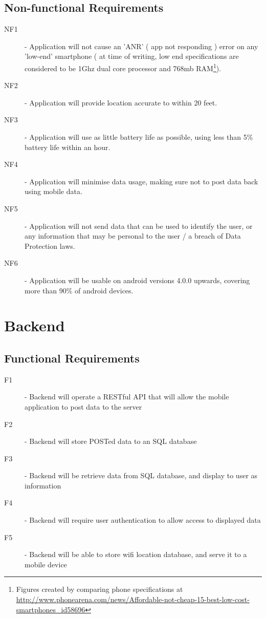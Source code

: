 \documentclass[11pt]{informatics-report}
\begin{document}
\subsection{Non-functional Requirements}
\begin{description}
\item[NF1] - Application will not cause an 'ANR' ( app not responding ) error on any 'low-end' smartphone ( at time of writing, low end specifications are considered to be 1Ghz dual core processor and 768mb RAM\footnote{Figures created by comparing phone specifications at \url{http://www.phonearena.com/news/Affordable-not-cheap-15-best-low-cost-smartphones_id58696}}).
\item[NF2] - Application will provide location accurate to within 20 feet.
\item[NF3] - Application will use as little battery life as possible, using less than 5\% battery life within an hour.
\item[NF4] - Application will minimise data usage, making sure not to post data back using mobile data.
\item[NF5] - Application will not send data that can be used to identify the user, or any information that may be personal to the user / a breach of Data Protection laws.
\item[NF6] - Application will be usable on android versions 4.0.0 upwards, covering more than 90\% of android devices\cite{androidstats}.
\end{description}

\section{Backend}
\subsection{Functional Requirements}
\begin{description}
\item[F1] - Backend will operate a RESTful API that will allow the mobile application to post data to the server
\item[F2] - Backend will store POSTed data to an SQL database
\item[F3] - Backend will be retrieve data from SQL database, and display to user as information
\item[F4] - Backend will require user authentication to allow access to displayed data
\item[F5] - Backend will be able to store wifi location database, and serve it to a mobile device
\end{description}
\end{document}
